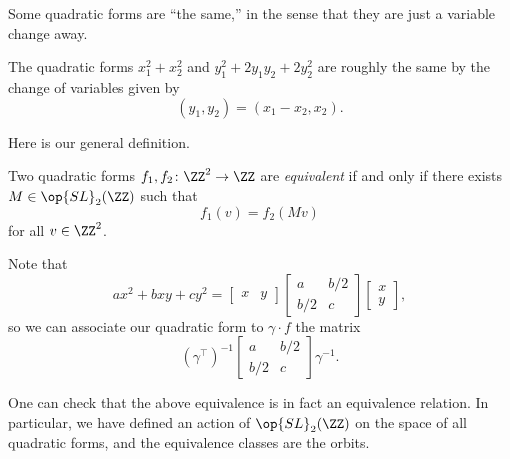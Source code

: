 \documentclass[../notes.tex]{subfiles}
\begin{document}
Some quadratic forms are ``the same,'' in the sense that they are just a variable change away.
\begin{example}
	The quadratic forms $x_1^2+x_2^2$ and $y_1^2+2y_1y_2+2y_2^2$ are roughly the same by the change of variables given by
	\[(y_1,y_2)=(x_1-x_2,x_2).\]
\end{example}
Here is our general definition.
\begin{definition}[equivalent]
	Two quadratic forms $f_1,f_2\colon\ZZ^2\to\ZZ$ are \textit{equivalent} if and only if there exists $M\in\op{SL}_2(\ZZ)$ such that
	\[f_1(v)=f_2(Mv)\]
	for all $v\in\ZZ^2$.
\end{definition}
\begin{remark}
	Note that
	\[ax^2+bxy+cy^2=\begin{bmatrix}
		x & y
	\end{bmatrix}\begin{bmatrix}
		a & b/2 \\
		b/2 & c
	\end{bmatrix}\begin{bmatrix}
		x \\ y
	\end{bmatrix},\]
	so we can associate our quadratic form to $\gamma\cdot f$ the matrix
	\[(\gamma^\intercal)^{-1}\begin{bmatrix}
		a & b/2 \\
		b/2 & c
	\end{bmatrix}\gamma^{-1}.\]
\end{remark}
One can check that the above equivalence is in fact an equivalence relation. In particular, we have defined an action of $\op{SL}_2(\ZZ)$ on the space of all quadratic forms, and the equivalence classes are the orbits.
\end{document}
